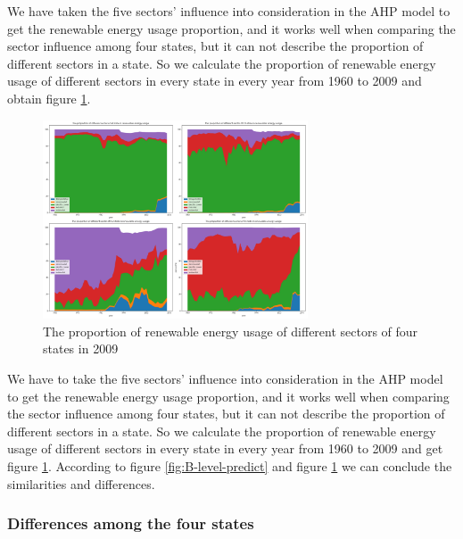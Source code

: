\documentclass[a4paper,11pt]{article}
\begin{document}
\par We have taken the five sectors' influence into consideration in the AHP model to get the renewable energy usage proportion, and it works well when comparing the sector influence among four states, but it can not describe the proportion of different sectors in a state. So we calculate the proportion of renewable energy usage of different sectors in every state in every year from 1960 to 2009 and obtain figure \ref{fig:B-percent}.
\begin{figure}[H]%
    \centering 
    \includegraphics[width=0.7\textwidth]{./Pic/B-percent.png}
    \caption{The proportion of renewable energy usage of different sectors of four states in 2009}
    \label{fig:B-percent}  
\end{figure}

\par We have to take the five sectors' influence into consideration in the AHP model to get the renewable energy usage proportion, and it works well when comparing the sector influence among four states, but it can not describe the proportion of different sectors in a state. So we calculate the proportion of renewable energy usage of different sectors in every state in every year from 1960 to 2009 and get figure \ref{fig:B-percent}. According to figure \ref{fig:B-level-predict} and figure \ref{fig:B-percent} we can conclude the similarities and differences.


\subsubsection{Differences among the four states}
\end{document}

